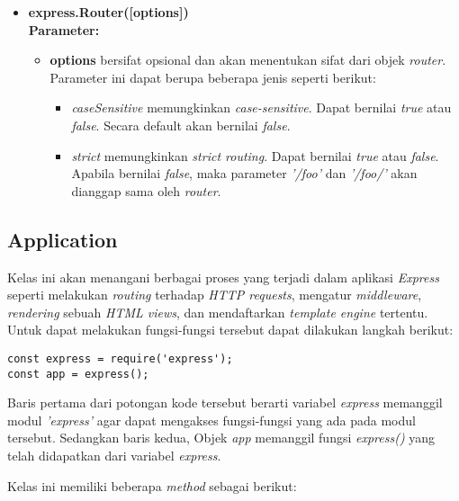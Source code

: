 \begin{itemize}
	\item \textbf{express.Router([options])} \\ \textbf{Parameter:} 
	\begin{itemize}
		\item \textbf{options} bersifat opsional dan akan menentukan sifat dari objek \textit{router}. Parameter ini dapat berupa beberapa jenis seperti berikut:
		\begin{itemize}
			\item \textit{caseSensitive} memungkinkan \textit{case-sensitive}. Dapat bernilai \textit{true} atau \textit{false}. Secara default akan bernilai \textit{false}.
			
			\item \textit{strict} memungkinkan \textit{strict routing}. Dapat bernilai \textit{true} atau \textit{false}. Apabila bernilai \textit{false}, maka parameter \textit{'/foo'} dan \textit{'/foo/'} akan dianggap sama oleh \textit{router}.
		\end{itemize}
	\end{itemize}
	
\end{itemize}

\subsection{Application}
Kelas ini akan menangani berbagai proses yang terjadi dalam aplikasi \textit{Express} seperti melakukan \textit{routing} terhadap \textit{HTTP requests}, mengatur \textit{middleware}, \textit{rendering} sebuah \textit{HTML views}, dan mendaftarkan \textit{template engine} tertentu. Untuk dapat melakukan fungsi-fungsi tersebut dapat dilakukan langkah berikut:

\begin{lstlisting}
const express = require('express');
const app = express();
\end{lstlisting}

Baris pertama dari potongan kode tersebut berarti variabel \textit{express} memanggil modul \textit{'express'} agar dapat mengakses fungsi-fungsi yang ada pada modul tersebut. Sedangkan baris kedua, Objek \textit{app} memanggil fungsi \textit{express()} yang telah didapatkan dari variabel \textit{express}.

Kelas ini memiliki beberapa \textit{method} sebagai berikut:

